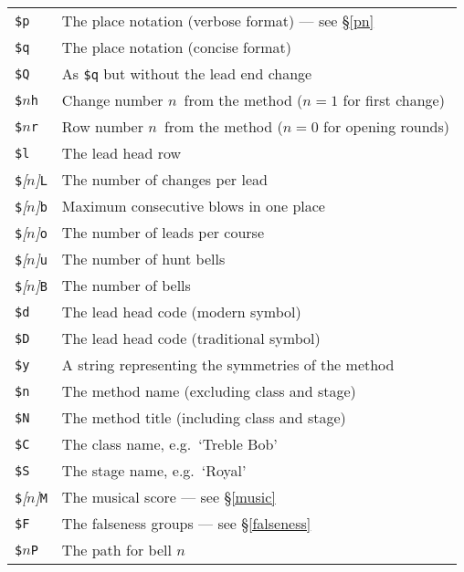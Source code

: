 \documentclass[a4paper,11pt,oneside]{book}
\makeatletter
\newcommand{\fspecd}[1]{\index{#1@{\hspace*{-\fspecwidth}\texttt{\$#1}}|ulink}}
\newcommand{\sref}[1]{\hyperref[#1]{\S\ref{#1}}}
\makeatother
\begin{document}
{\def\D{\texttt{\$}}\def\N{$n$\/}\def\No{\textit{[$n$]}\/}
\def\F#1{\texttt{#1}\fspecd{#1}}
\begin{tabularx}{\textwidth}{lX}
\D\F{p}&The place notation (verbose format) --- see \sref{pn}\\
\D\F{q}&The place notation (concise format)\\
\D\F{Q}&As \texttt{\$q} but without the lead end change%
  \index{place notation!printing|see{\texttt{\$p}, %
    \texttt{\$q} \textit{and} \texttt{\$Q}}}\\
\D\N\F{h}&Change number \N\ from the method ($n=1$ for first change)%
  \index{changes, printing|see{\texttt{\$h}}}\\
\D\N\F{r}&Row number \N\ from the method ($n=0$ for opening rounds)%
  \index{rows, printing|see{\texttt{\$r}}}\\
\D\F{l}&The lead head row%
  \index{lead head!printing|see{\texttt{\$l}}}\\
\D\No\F{L}&The number of changes per lead%
  \index{lead length!printing|see{\texttt{\$L}}}\\
\D\No\F{b}&Maximum consecutive blows in one place%
  \index{blows, maximum consecutive!printing|see{\texttt{\$b}}}\\
\D\No\F{o}&The number of leads per course\\
\D\No\F{u}&The number of hunt bells\\
\D\No\F{B}&The number of bells\\
\D\F{d}&The lead head code (modern symbol)\\
\D\F{D}&The lead head code (traditional symbol)
  \index{lead head!code|see{\texttt{\$d} \textit{and} \texttt{\$D}}}\\
\D\F{y}&A string representing the symmetries of the method%
  \index{symmetry!printing|see{\texttt{\$y}}}\\
\D\F{n}&The method name (excluding class and stage)\\
\D\F{N}&The method title (including class and stage)\\
\D\F{C}&The class name, e.g.\ `Treble Bob'%
  \index{class!printing name|see{\texttt{\$C}}}\\
\D\F{S}&The stage name, e.g.\ `Royal'%
  \index{stage!printing name|see{\texttt{\$S}}}\\
\D\No\F{M}&The musical score --- see \sref{music}\\
\D\F{F}&The falseness groups --- see \sref{falseness}\\
\D\N\F{P}&The path for bell \N\\

\end{tabularx}}
\end{document}
